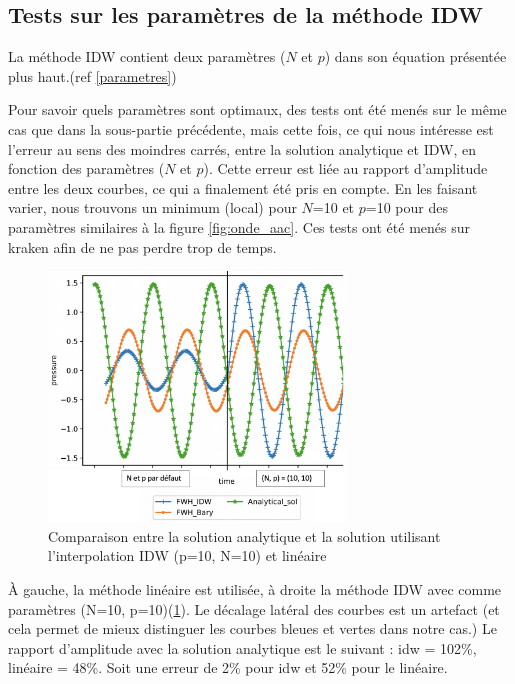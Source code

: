 \subsection{Tests sur les paramètres de la méthode IDW}

La méthode IDW contient deux paramètres (\(N\) et \(p\)) dans son équation présentée plus haut.(ref \ref{parametres})

Pour savoir quels paramètres sont optimaux, des tests ont été menés sur le même cas que dans la sous-partie précédente, mais cette fois, ce qui nous intéresse est l'erreur au sens des moindres carrés, entre la solution analytique et IDW, en fonction des paramètres (\(N\) et \(p\)). Cette erreur est liée au rapport d'amplitude entre les deux courbes, ce qui a finalement été pris en compte. En les faisant varier, nous trouvons un minimum (local) pour \(N\)=10 et \(p\)=10 pour des paramètres similaires à la figure \ref{fig:onde_aac}.
Ces tests ont été menés sur kraken afin de ne pas perdre trop de temps.

\begin{figure}[H]
    \centering
    \includegraphics[width=0.70\textwidth]{images/rapport_a_np.png}
    \caption{Comparaison entre la solution analytique et la solution utilisant l'interpolation IDW (p=10, N=10) et linéaire}
    \label{fig:np10}
\end{figure}

À gauche, la méthode linéaire est utilisée, à droite la méthode IDW avec comme paramètres (N=10, p=10)(\ref{fig:np10}). Le décalage latéral des courbes est un artefact (et cela permet de mieux distinguer les courbes bleues et vertes dans notre cas.)
Le rapport d'amplitude avec la solution analytique est le suivant : idw = 102\%, linéaire = 48\%. Soit une erreur de 2\% pour idw et 52\% pour le linéaire. %






